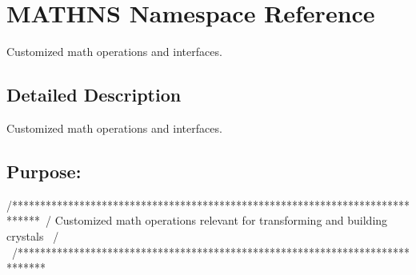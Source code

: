 \hypertarget{namespace_m_a_t_h_n_s}{}\section{M\+A\+T\+H\+N\+S Namespace Reference}
\label{namespace_m_a_t_h_n_s}


Customized math operations and interfaces.  




\subsection{Detailed Description}
Customized math operations and interfaces. 

\subsection*{{\bfseries Purpose\+:} }

\begin{DoxyVerb}/*****************************************************************************\
/  Customized math operations relevant for transforming and building crystals \
/                                                                             \
/*****************************************************************************\
\end{DoxyVerb}


